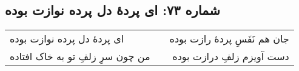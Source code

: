 \begin{center}
\section*{شماره ۷۳: ای پردۀ دل پرده نوازت بوده}
\label{sec:073}
\begin{longtable}{l p{0.5cm} r}
ای پردهٔ دل پرده نوازت بوده
&&
جان هم نَفَسِ پردهٔ رازت بوده
\\
من چون سرِ زلفِ تو به خاک افتاده
&&
دست آویزم زلفِ درازت بوده
\\
\end{longtable}
\end{center}

